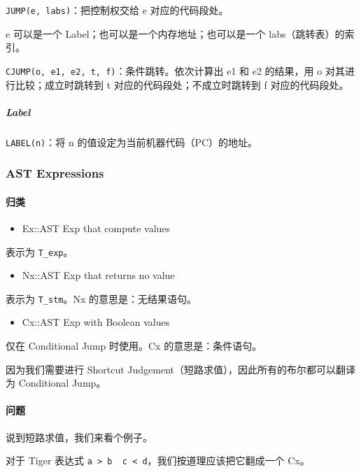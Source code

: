 \documentclass[
]{article}
\begin{document}
\texttt{JUMP(e,\ labs)}：把控制权交给 e 对应的代码段处。

e 可以是一个 Label；也可以是一个内存地址；也可以是一个
labs（跳转表）的索引。

\texttt{CJUMP(o,\ e1,\ e2,\ t,\ f)}：条件跳转。依次计算出 e1 和 e2
的结果，用 o 对其进行比较；成立时跳转到 t 对应的代码段处；不成立时跳转到
f 对应的代码段处。

\hypertarget{header-n65}{%
\subparagraph{Label}\label{header-n65}}

\texttt{LABEL(n)}：将 n 的值设定为当前机器代码（PC）的地址。

\hypertarget{header-n67}{%
\subsubsection{AST Expressions}\label{header-n67}}

\hypertarget{header-n68}{%
\paragraph{归类}\label{header-n68}}

\begin{itemize}
\item
  Ex::AST Exp that compute values
\end{itemize}

表示为 \texttt{T\_exp}。

\begin{itemize}
\item
  Nx::AST Exp that returns no value
\end{itemize}

表示为 \texttt{T\_stm}。Nx 的意思是：无结果语句。

\begin{itemize}
\item
  Cx::AST Exp with Boolean values
\end{itemize}

仅在 Conditional Jump 时使用。Cx 的意思是：条件语句。

因为我们需要进行 Shortcut
Judgement（短路求值），因此所有的布尔都可以翻译为 Conditional Jump。

\hypertarget{header-n82}{%
\paragraph{问题}\label{header-n82}}

说到短路求值，我们来看个例子。

对于 Tiger 表达式
\texttt{a\ \textgreater{}\ b\ \textbar{}\ c\ \textless{}\ d}，我们按道理应该把它翻成一个
Cx。
\end{document}
